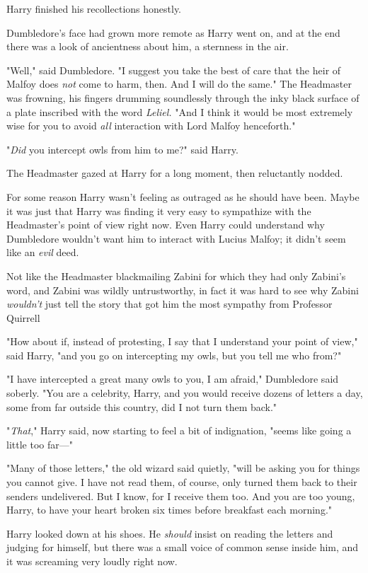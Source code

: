 Harry finished his recollections honestly.

Dumbledore's face had grown more remote as Harry went on, and at the end there
was a look of ancientness about him, a sternness in the air.

"Well," said Dumbledore. "I suggest you take the best of care that the heir of
Malfoy does \emph{not} come to harm, then. And I will do the same." The
Headmaster was frowning, his fingers drumming soundlessly through the inky
black surface of a plate inscribed with the word \emph{Leliel.} "And I think it
would be most extremely wise for you to avoid \emph{all} interaction with Lord
Malfoy henceforth."

"\emph{Did} you intercept owls from him to me?" said Harry.

The Headmaster gazed at Harry for a long moment, then reluctantly nodded.

For some reason Harry wasn't feeling as outraged as he should have been. Maybe
it was just that Harry was finding it very easy to sympathize with the
Headmaster's point of view right now. Even Harry could understand why
Dumbledore wouldn't want him to interact with Lucius Malfoy; it didn't seem
like an \emph{evil} deed.

Not like the Headmaster blackmailing Zabini{\el} for which they had only
Zabini's word, and Zabini was wildly untrustworthy, in fact it was hard to see
why Zabini \emph{wouldn't} just tell the story that got him the most sympathy
from Professor Quirrell{\el}

"How about if, instead of protesting, I say that I understand your point of
view," said Harry, "and you go on intercepting my owls, but you tell me who
from?"

"I have intercepted a great many owls to you, I am afraid," Dumbledore said
soberly. "You are a celebrity, Harry, and you would receive dozens of letters a
day, some from far outside this country, did I not turn them back."

"\emph{That}," Harry said, now starting to feel a bit of indignation, "seems
like going a little too far\mbox{---}"

"Many of those letters," the old wizard said quietly, "will be asking you for
things you cannot give. I have not read them, of course, only turned them back
to their senders undelivered. But I know, for I receive them too. And you are
too young, Harry, to have your heart broken six times before breakfast each
morning."

Harry looked down at his shoes. He \emph{should} insist on reading the letters
and judging for himself, but{\el} there was a small voice of common sense
inside him, and it was screaming very loudly right now.

